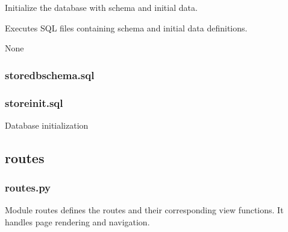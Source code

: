 \documentclass[letterpaper,10pt,english]{sphinxmanual}
\begin{document}

\begin{fulllineitems}
\label{\detokenize{store-service:db_api.init_database}}
\pysigstartsignatures
\pysiglinewithargsret
{}
{}
{}
\pysigstopsignatures
\sphinxAtStartPar
Initialize the database with schema and initial data.

\sphinxAtStartPar
Executes SQL files containing schema and initial data definitions.
\begin{description}
\sphinxAtStartPar
None

\end{description}

\end{fulllineitems}



\subsubsection{store\sphinxhyphen{}db\sphinxhyphen{}schema.sql}
\label{\detokenize{store-service:store-db-schema-sql}}
\noindent{}


\subsubsection{store\sphinxhyphen{}init.sql}
\label{\detokenize{store-service:store-init-sql}}
\sphinxAtStartPar
Database initialization


\subsection{routes}
\label{\detokenize{store-service:routes}}

\subsubsection{routes.py}
\label{\detokenize{store-service:module-routes}}\label{\detokenize{store-service:routes-py}}
\sphinxAtStartPar
Module routes defines the routes and their corresponding view functions.
It handles page rendering and navigation.
\end{document}
